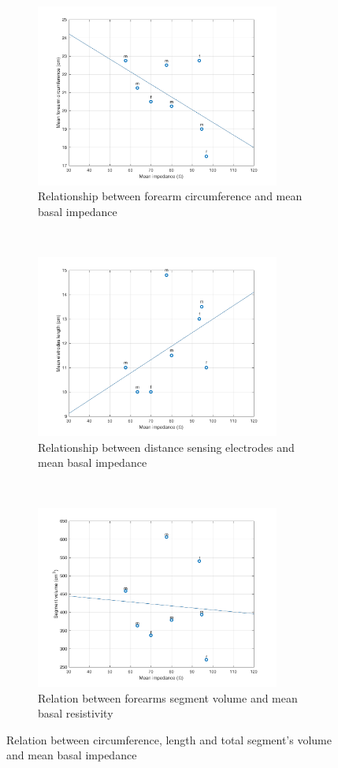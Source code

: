 \begin{figure}[!htbp]
	\centering
	\begin{subfigure}[t]{0.5\textwidth}
		\centering
		\includegraphics[height=6cm]{figure2a}
		\caption{Relationship between forearm circumference and mean basal impedance}
		\label{fig:C_vs_Z}
	\end{subfigure}%
	~ 
	\begin{subfigure}[t]{0.5\textwidth}
		\centering
		\includegraphics[height=6cm]{figure2b}
		\caption{Relationship between distance sensing electrodes and mean basal impedance}
		\label{fig:l_vs_Z}
	\end{subfigure}
	~ 
	\begin{subfigure}[t]{0.5\textwidth}
		\centering
		\includegraphics[height=6cm]{figure2c}
		\caption{Relation between forearms segment volume and mean basal resistivity}
		\label{fig:Ve_vs_Z}
	\end{subfigure}
	\caption{Relation between circumference, length and total segment's volume and mean basal impedance}
	\label{fig:relation_geometry_vs_impedance}
\end{figure}


